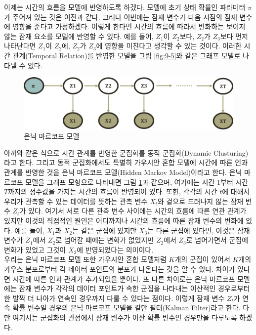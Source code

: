 \documentclass[a4paper]{oblivoir}
\begin{document}
이제는 시간의 흐름을 모델에 반영하도록 하겠다. 모델에 초기 상태 확률인 파라미터 $\pi$가 주어져 있는 것은 이전과 같다. 그러나 이번에는 잠재 변수가 다음 시점의 잠재 변수에 영향을 준다고 가정하겠다. 이렇게 한다면 시간의 흐름에 따라서 변화하는 보이지 않는 잠재 요소를 모델에 반영할 수 있다. 예를 들어, $Z_1$이 $Z_2$보다, $Z_2$가 $Z_3$보다 먼저 나타난다면 $Z_1$이 $Z_2$에, $Z_2$가 $Z_3$에 영향을 미친다고 생각할 수 있는 것이다. 이러한 시간 관계(Temporal Relation)를 반영한 모델을 그림 \ref{fig:9-5}와 같은 그래프 모델로 나타낼 수 있다.  \\

\begin{figure}[ht] \centering 
\includegraphics[scale=0.7]{fig9_6.png} 
\caption{은닉 마르코프 모델}
\label{fig:9-6}
\end{figure}

아까와 같은 식으로 시간 관계를 반영한 군집화를 동적 군집화(Dynamic Clusturing)라고 한다. 그리고 동적 군집화에서도 특별히 가우시안 혼합 모델에 시간에 따른 인과 관계를 반영한 것을 은닉 마르코프 모델(Hidden Markov Model)이라고 한다. 은닉 마르코프 모델을 그래프 모형으로 나타내면 그림 \ref{fig:9-6}과 같으며, 여기에는 시간 $1$부터 시간 $T$까지의 정수값을 가지는 시간의 흐름이 반영되어 있다. 또한, 각각의 시간 $t$에 대해서 우리가 관측할 수 있는 데이터를 뜻하는 관측 변수 $X_t$와 겉으로 드러나지 않는 잠재 변수 $Z_t$가 있다. 여기서 서로 다른 관측 변수 사이에는 시간의 흐름에 따른 연관 관계가 있지만 이것의 직접적인 원인은 어디까지나 시간의 흐름에 따른 잠재 변수의 변화에 있다. 예를 들어, $X_1$과 $X_2$는 같은 군집에 있지만 $X_3$는 다른 군집에 있다면, 이것은 잠재 변수가 $Z_1$에서 $Z_2$로 넘어갈 때에는 변화가 없었지만 $Z_2$에서 $Z_3$로 넘어가면서 군집에 변화가 있었고 그것이 $X_3$에 반영되었다는 의미이다. \\

우리는 은닉 마르코프 모델 또한 가우시안 혼합 모델처럼 $K$개의 군집이 있어서 $K$개의 가우스 분포로부터 각 데이터 포인트의 분포가 나온다는 것을 알 수 있다. 차이가 있다면 시간에 따른 인과 관계가 추가되었을 뿐이다. 또 다른 차이로는 은닉 마르코프 모델에는 잠재 변수가 각각의 데이터 포인트가 속한 군집을 나타내는 이산적인 경우로부터 한 발짝 더 나아가 연속인 경우까지 다룰 수 있다는 점이다. 이렇게 잠재 변수 $Z_t$가 연속 확률 변수일 경우의 은닉 마르코프 모델을 칼만 필터(Kalman Filter)라고 한다. 다만 여기서는 군집화의 관점에서 잠재 변수가 이산 확률 변수인 경우만을 다루도록 하겠다. \\
\end{document}
